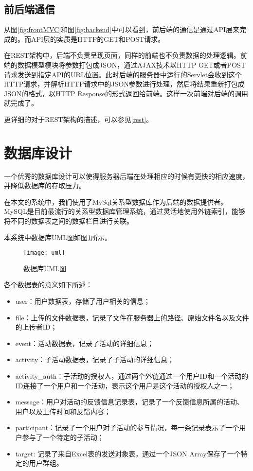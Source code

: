 \subsection{前后端通信}

从图\ref{fig:frontMVC}和图\ref{fig:backend}中可以看到，前后端的通信是通过API层来完成的。而API层的实质是HTTP的GET和POST请求。

在REST架构中，后端不负责呈现页面，同样的前端也不负责数据的处理逻辑。前端的数据模型模块将参数打包成JSON，通过AJAX技术以HTTP GET或者POST请求发送到指定API的URL位置。此时后端的服务器中运行的Servlet会收到这个HTTP请求，并解析HTTP请求中的JSON参数进行处理，然后将结果重新打包成JSON的格式，以HTTP Response的形式返回给前端。这样一次前端对后端的调用就完成了。

更详细的对于REST架构的描述，可以参见\ref{rest}。

\section{数据库设计}

一个优秀的数据库设计可以使得服务器后端在处理相应的时候有更快的相应速度，并降低数据库的存取压力。

在本文的系统中，我们使用了MySql关系型数据库作为后端的数据提供者。MySQL是目前最流行的关系型数据库管理系统，通过灵活地使用外链索引，能够将不同的数据表之间的数据栏目进行关联。

本系统中数据库UML图如图\ref{fig:uml}所示。

\begin{figure}[H]
  \centering
  \texttt{[image: uml]}
  \caption{数据库UML图}
  \label{fig:uml}
\end{figure}

各个数据表的意义如下所述：

\begin{itemize}
\item user：用户数据表，存储了用户相关的信息；
\item file：上传的文件数据表，记录了文件在服务器上的路径、原始文件名以及文件的上传者ID；
\item event：活动数据表，记录了活动的详细信息；
\item activity：子活动数据表，记录了子活动的详细信息；
\item activity\_auth：子活动的授权人，通过两个外链通过一个用户ID和一个活动的ID连接了一个用户和一个活动，表示这个用户是这个活动的授权人之一；
\item message：用户对活动的反馈信息记录表，记录了一个反馈信息所属的活动、用户以及上传时间和反馈内容；
\item participant：记录了一个用户对子活动的参与情况，每一条记录表示了一个用户参与了一个特定的子活动；
\item target: 记录了来自Excel表的发送对象表，通过一个JSON Array保存了一个特定的用户群组。
\end{itemize}

